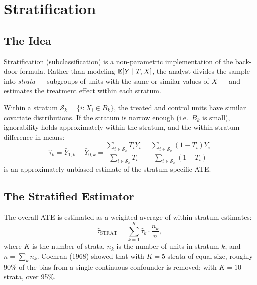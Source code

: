 \documentclass[master.tex]{subfiles}
\begin{document}
\section{Stratification}
\label{w5:sec:stratification}

\subsection{The Idea}

Stratification (subclassification) is a non-parametric implementation
of the back-door formula.  Rather than modeling $\mathbb{E}[Y \mid T, X]$, the
analyst divides the sample into \emph{strata} --- subgroups of units
with the same or similar values of $X$ --- and estimates the treatment
effect within each stratum.

Within a stratum $\mathcal{S}_k = \{i : X_i \in B_k\}$, the treated and
control units have similar covariate distributions.  If the stratum is
narrow enough (i.e.\ $B_k$ is small), ignorability holds approximately
within the stratum, and the within-stratum difference in means:
\[
  \hat\tau_k
  = \bar Y_{1,k} - \bar Y_{0,k}
  = \frac{\sum_{i \in \mathcal{S}_k} T_i Y_i}{\sum_{i \in \mathcal{S}_k} T_i}
  - \frac{\sum_{i \in \mathcal{S}_k} (1-T_i) Y_i}{\sum_{i \in \mathcal{S}_k} (1-T_i)}
\]
is an approximately unbiased estimate of the stratum-specific ATE.

\subsection{The Stratified Estimator}

The overall ATE is estimated as a weighted average of within-stratum
estimates:
\begin{equation}
  \hat\tau_{\mathrm{STRAT}}
  = \sum_{k=1}^K \hat\tau_k \cdot \frac{n_k}{n},
  \label{w5:eq:strat}
\end{equation}
where $K$ is the number of strata, $n_k$ is the number of units in
stratum $k$, and $n = \sum_k n_k$.  Cochran (1968) showed that with
$K = 5$ strata of equal size, roughly 90\% of the bias from a single
continuous confounder is removed; with $K = 10$ strata, over 95\%.
\end{document}
